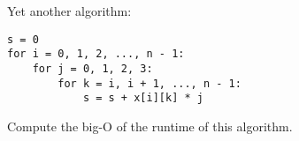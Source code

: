Yet another algorithm:
\begin{Verbatim}[frame=single, fontsize=\small]
s = 0
for i = 0, 1, 2, ..., n - 1:
    for j = 0, 1, 2, 3:
        for k = i, i + 1, ..., n - 1:
            s = s + x[i][k] * j
\end{Verbatim}
Compute the big-O of the runtime of this algorithm.
